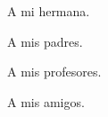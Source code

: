 \begin{dedication}
    A mi hermana.

    A mis padres.

    A mis profesores.

    A mis amigos.

\end{dedication}